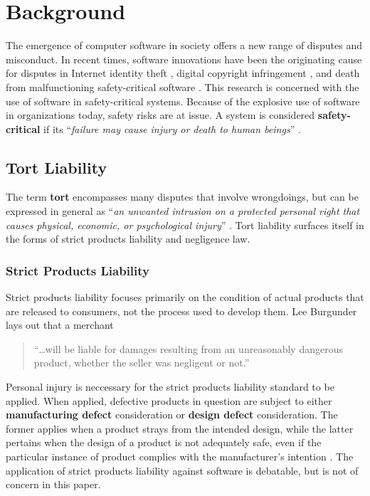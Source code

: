 \section{Background}
The emergence of computer software in society offers a new range of disputes and
misconduct. In recent times, software innovations have been the originating
cause for disputes in Internet identity theft \cite{Valetk2004}, digital
copyright infringement \cite{Manesh2006}, and death from malfunctioning
safety-critical software \cite{Leveson1993}. This research is concerned with the
use of software in safety-critical systems. Because of the explosive use of
software in organizations today, safety risks are at issue. A system is 
considered \textbf{safety-critical} if its ``\textit{failure may cause injury or
death to human beings}'' \cite{FOLDOC}.

\subsection{Tort Liability}
The term \textbf{tort} encompasses many disputes that involve wrongdoings, but 
can be expressed in general as ``\textit{an unwanted intrusion on a protected
personal right that causes physical, economic, or psychological injury}'' 
\cite{Burgunder2004}. Tort liability surfaces itself in the forms of strict
products liability and negligence law.

\subsubsection{Strict Products Liability}
Strict products liability focuses primarily on the condition of actual products
that are released to consumers, not the process used to develop them. Lee
Burgunder lays out that a merchant

\begin{quote}
``\ldots will be liable for damages resulting from an unreasonably dangerous
product, whether the seller was negligent or not.'' \cite{Burgunder2004}
\end{quote}

Personal injury is neccessary for the strict products liability standard to be
applied. When applied, defective products in question are subject to either
\textbf{manufacturing defect} consideration or \textbf{design defect}
consideration. The former applies when a product strays from the intended
design, while the latter pertains when the design of a product is not adequately
safe, even if the particular instance of product complies with the
manufacturer's intention \cite{Turner1999}. The application of strict products
liability against software is debatable, but is not of concern in this paper.

